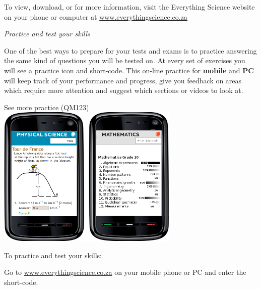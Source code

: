 \newpage
\thispagestyle{empty}
{\Large

To view, download, or for more information, visit the Everything Science website on your phone or
computer at \underline{www.everythingscience.co.za}  \par
\vspace*{1cm}
{\normalfont\sffamily\fontsize{22}\normalfont\itshape Practice and test your skills} \par


One of the best ways to prepare for your tests and exams is to practice answering the same kind of
questions you will be tested on. At every set of exercises you will see a practice icon and short-code.
This on-line practice for \textbf{mobile} and \textbf{PC} will keep track of your performance and progress, give you
feedback on areas which require more attention and suggest which sections or videos to look at.

\begin{center}
See more practice  (QM123) \\
\includegraphics[width=0.65\textwidth]{title_images/practicephones.png}
\end{center}
\par



To practice and test your skills:\par

Go to \underline{www.everythingscience.co.za} on your mobile phone or PC and enter the short-code.\par

\vspace*{1cm}


}
